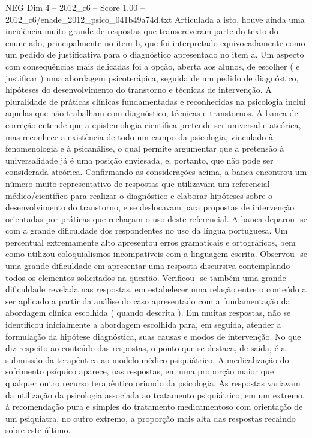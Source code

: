 \begin{textsample}{NEG Dim 4 – 2012\_c6 – Score 1.00 – 2012\_c6/enade\_2012\_psico\_041b49a74d.txt}
Articulada a isto, houve ainda uma incidência muito grande de respostas que transcreveram parte do texto do enunciado, principalmente no item b, que foi interpretado equivocadamente como um pedido de justificativa para o diagnóstico apresentado no item a.
Um aspecto com consequências mais delicadas foi a opção, aberta aos alunos, de escolher ( e justificar ) uma abordagem psicoterápica, seguida de um pedido de diagnóstico, hipóteses do desenvolvimento do transtorno e técnicas de intervenção.
A pluralidade de práticas clínicas fundamentadas e reconhecidas na psicologia inclui aquelas que não trabalham com diagnóstico, técnicas e transtornos.
A banca de correção entende que a epistemologia científica pretende ser universal e ateórica, mas reconhece a existência de todo um campo da psicologia, vinculado à fenomenologia e à psicanálise, o qual permite argumentar que a pretensão à universalidade já é uma posição enviesada, e, portanto, que não pode ser considerada ateórica.
Confirmando as considerações acima, a banca encontrou um número muito representativo de respostas que utilizavam um referencial médico/científico para realizar o diagnóstico e elaborar hipóteses sobre o desenvolvimento do transtorno, e se deslocavam para propostas de intervenção orientadas por práticas que rechaçam o uso deste referencial.
A banca deparou -se com a grande dificuldade dos respondentes no uso da língua portuguesa.
Um percentual extremamente alto apresentou erros gramaticais e ortográficos, bem como utilizou coloquialismos incompatíveis com a linguagem escrita.
Observou -se uma grande dificuldade em apresentar uma resposta discursiva contemplando todos os elementos solicitados na questão.
Verificou -se também uma grande dificuldade revelada nas respostas, em estabelecer uma relação entre o conteúdo a ser aplicado a partir da análise do caso apresentado com a fundamentação da abordagem clínica escolhida ( quando descrita ).
Em muitas respostas, não se identificou inicialmente a abordagem escolhida para, em seguida, atender a formulação da hipótese diagnóstica, suas causas e modos de intervenção.
No que diz respeito ao conteúdo das respostas, o ponto que se destaca, de saída, é a submissão da terapêutica ao modelo médico-psiquiátrico.
A medicalização do sofrimento psíquico aparece, nas respostas, em uma proporção maior que qualquer outro recurso terapêutico oriundo da psicologia.
As respostas variavam da utilização da psicologia associada ao tratamento psiquiátrico, em um extremo, à recomendação pura e simples do tratamento medicamentoso com orientação de um psiquiatra, no outro extremo, a proporção mais alta das respostas recaindo sobre este último.

\end{textsample}
